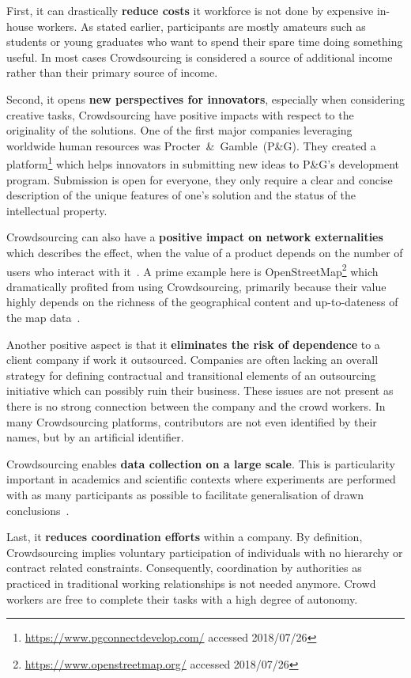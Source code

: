 \documentclass[draft,final]{vutinfth} %
\begin{document}
First, it can drastically \textbf{reduce costs} it workforce is not done by expensive in-house workers. As stated earlier, participants are mostly amateurs such as students or young graduates who want to spend their spare time doing something useful. In most cases Crowdsourcing is considered a source of additional income rather than their primary source of income. 

Second, it opens \textbf{new perspectives for innovators}, especially when considering creative tasks, Crowdsourcing have positive impacts with respect to the originality of the solutions. One of the first major companies leveraging worldwide human resources was Procter~\&~Gamble~(P\&G). They created a platform\footnote{\url{https://www.pgconnectdevelop.com/} accessed 2018/07/26} which helps innovators in submitting new ideas to P\&G's development program. Submission is open for everyone, they only require a clear and concise description of the unique features of one's solution and the status of the intellectual property. 

Crowdsourcing can also have a \textbf{positive impact on network externalities} which describes the effect, when the value of a product depends on the number of users who interact with it~\cite{shapiro1998}. A prime example here is OpenStreetMap\footnote{\url{https://www.openstreetmap.org/} accessed 2018/07/26} which dramatically profited from using Crowdsourcing, primarily because their value highly depends on the richness of the geographical content and up-to-dateness of the map data~\cite{chilton2009}. 

Another positive aspect is that it \textbf{eliminates the risk of dependence} to a client company if work it outsourced. Companies are often lacking an overall strategy for defining contractual and transitional elements of an outsourcing initiative which can possibly ruin their business. These issues are not present as there is no strong connection between the company and the crowd workers. In many Crowdsourcing platforms, contributors are not even identified by their names, but by an artificial identifier. 

Crowdsourcing enables \textbf{data collection on a large scale}. This is particularity important in academics and scientific contexts where experiments are performed with as many participants as possible to facilitate generalisation of drawn conclusions~\cite{gadiraju2017}. 

Last, it \textbf{reduces coordination efforts} within a company. By definition, Crowdsourcing implies voluntary participation of individuals with no hierarchy or contract related constraints. Consequently, coordination by authorities as practiced in traditional working relationships is not needed anymore. Crowd workers are free to complete their tasks with a high degree of autonomy. 
\end{document}
